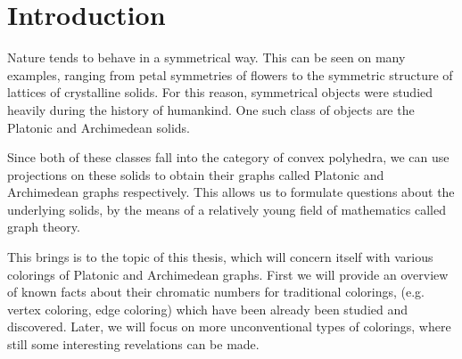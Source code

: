\chapter*{Introduction}

Nature tends to behave in a symmetrical way. This can be seen on many examples, ranging from petal symmetries of flowers to the symmetric structure of lattices of crystalline solids. For this reason, symmetrical objects were studied heavily during the history of humankind. One such class of objects are the Platonic and Archimedean solids.

Since both of these classes fall into the category of convex polyhedra, we can use projections on these solids to obtain their graphs called Platonic and Archimedean graphs respectively. This allows us to formulate questions about the underlying solids, by the means of a relatively young field of mathematics called graph theory.

This brings is to the topic of this thesis, which will concern itself with various colorings of Platonic and Archimedean graphs. First we will provide an overview of known facts about their chromatic numbers for traditional colorings, (e.g. vertex coloring, edge coloring) which have been already been studied and discovered. Later, we will focus on more unconventional types of colorings, where still some interesting revelations can be made.

\newenvironment{redtext}
  {\color{red}} %
  {} %

